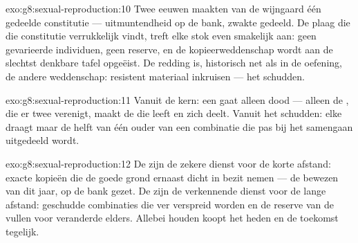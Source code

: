 \begin{solution}{exo:g8:sexual-reproduction:10}
Twee eeuwen  maakten van de wijngaard één gedeelde constitutie ---
uitmuntendheid op de bank, zwakte gedeeld. De plaag die die constitutie
verrukkelijk vindt, treft elke stok even smakelijk aan: geen gevarieerde
individuen, geen reserve, en de kopieerweddenschap wordt aan de slechtst
denkbare tafel opgeëist. De redding is, historisch net als in de oefening,
de andere weddenschap: resistent materiaal inkruisen --- het schudden.
\end{solution}

\begin{solution}{exo:g8:sexual-reproduction:11}
Vanuit de kern: een  gaat alleen dood --- alleen de ,
die er twee verenigt, maakt de  die leeft en zich deelt. Vanuit het
schudden: elke  draagt maar de helft van één ouder van een
combinatie die pas bij het samengaan uitgedeeld wordt.
\end{solution}

\begin{solution}{exo:g8:sexual-reproduction:12}
De  zijn de zekere dienst voor de korte afstand: exacte kopieën
die de goede grond ernaast dicht in bezit nemen --- de bewezen  van
dit jaar, op de bank gezet. De  zijn de verkennende dienst voor de
lange afstand: geschudde combinaties die ver verspreid worden en de
reserve van de  vullen voor veranderde  elders.
Allebei houden koopt het heden en de toekomst tegelijk.
\end{solution}

